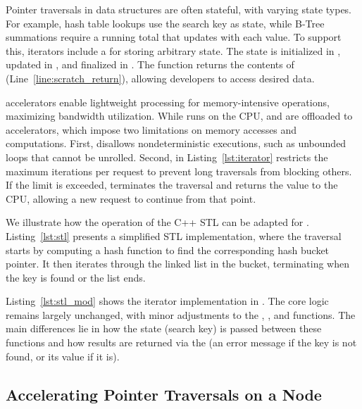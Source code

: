   
  
 Pointer traversals in data structures are often stateful, with varying state types. For example, hash table lookups use the search key as state, while B-Tree summations require a running total that updates with each value. To support this, \pulse iterators include a  for storing arbitrary state. The state is initialized in , updated in , and finalized in . The  function returns the contents of  (Line~\ref{line:scratch_return}), allowing developers to access desired data.

 \pulse accelerators enable lightweight processing for memory-intensive operations, maximizing bandwidth utilization. While  runs on the CPU,  and  are offloaded to \pulse accelerators, which impose two limitations on memory accesses and computations. First, \pulse disallows nondeterministic executions, such as unbounded loops that cannot be unrolled. Second,  in Listing~\ref{lst:iterator} restricts the maximum iterations per request to prevent long traversals from blocking others. If the limit is exceeded, \pulse terminates the traversal and returns the  value to the CPU, allowing a new request to continue from that point.
  

 We illustrate how the  operation of the C++ STL  can be adapted for \pulse. Listing~\ref{lst:stl} presents a simplified STL implementation, where the traversal starts by computing a hash function to find the corresponding hash bucket pointer. It then iterates through the linked list in the bucket, terminating when the key is found or the list ends.

Listing~\ref{lst:stl_mod} shows the iterator implementation in \pulse. The core logic remains largely unchanged, with minor adjustments to the , , and  functions. The main differences lie in how the state (search key) is passed between these functions and how results are returned via the  (an error message if the key is not found, or its value if it is).


\subsection{Accelerating Pointer Traversals on a Node}
\label{ssec:accelerator}


